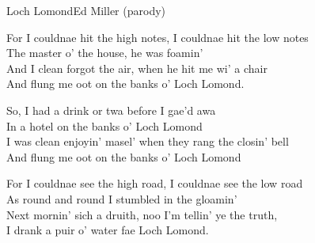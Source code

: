 \begin{song}{Loch Lomond}{Ed Miller (parody)}
\begin{guitar}
For I couldnae hit the high notes, I couldnae hit the low notes\\
The master o' the house, he was foamin'\\
And I clean forgot the air, when he hit me wi' a chair\\
And flung me oot on the banks o' Loch Lomond.\\
\end{guitar}


\begin{guitar}
So, I had a drink or twa before I gae'd awa\\
In a hotel on the banks o' Loch Lomond\\
I was clean enjoyin' masel' when they rang the closin' bell\\
And flung me oot on the banks o' Loch Lomond\\
\end{guitar}

\begin{guitar}
For I couldnae see the high road, I couldnae see the low road\\
As round and round I stumbled in the gloamin'\\
Next mornin' sich a druith, noo I'm tellin' ye the truth,\\
I drank a puir o' water fae Loch Lomond.\\
\end{guitar}
\end{song}

